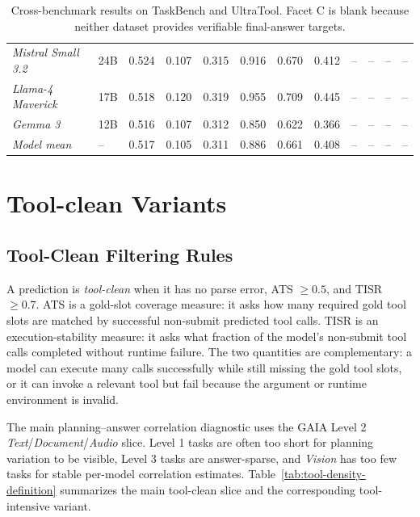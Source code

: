 \documentclass{article}
\providecommand{\model}[1]{\emph{#1}}
\begin{document}
\begin{table}[t]
{\begin{tabular}{llcccccccccc}
\model{Mistral Small 3.2} & 24B & 0.524 & 0.107 & 0.315 & 0.916 & 0.670 & 0.412 & -- & -- & -- & -- \\
\model{Llama-4 Maverick} & 17B & 0.518 & 0.120 & 0.319 & 0.955 & 0.709 & 0.445 & -- & -- & -- & -- \\
\model{Gemma 3} & 12B & 0.516 & 0.107 & 0.312 & 0.850 & 0.622 & 0.366 & -- & -- & -- & -- \\
\emph{Model mean} & -- & 0.517 & 0.105 & 0.311 & 0.886 & 0.661 & 0.408 & -- & -- & -- & -- \\
\bottomrule
\end{tabular}
}
\vspace{0.005cm}
\caption{Cross-benchmark results on TaskBench and UltraTool. Facet C is blank because neither dataset provides verifiable final-answer targets.}
\label{tab:appendix-cross-benchmark-taskbench-ultratool}
\end{table}
\FloatBarrier
\section{Tool-clean Variants}
\label{sec:appendix-tool-clean}

\subsection{Tool-Clean Filtering Rules}
A prediction is \emph{tool-clean} when it has no parse error, ATS $\ge 0.5$, and TISR $\ge 0.7$. ATS is a gold-slot coverage measure: it asks how many required gold tool slots are matched by successful non-submit predicted tool calls. TISR is an execution-stability measure: it asks what fraction of the model's non-submit tool calls completed without runtime failure. The two quantities are complementary: a model can execute many calls successfully while still missing the gold tool slots, or it can invoke a relevant tool but fail because the argument or runtime environment is invalid.

The main planning--answer correlation diagnostic uses the GAIA Level 2 \emph{Text}/\emph{Document}/\emph{Audio} slice. Level 1 tasks are often too short for planning variation to be visible, Level 3 tasks are answer-sparse, and \emph{Vision} has too few tasks for stable per-model correlation estimates. Table~\ref{tab:tool-density-definition} summarizes the main tool-clean slice and the corresponding tool-intensive variant.
\end{document}

